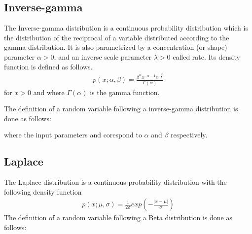 \documentclass[letterpaper,10pt,english]{sphinxmanual}
\begin{document}
\subsection{Inverse-gamma}
\label{\detokenize{notes/guidemodels:inverse-gamma}}
The Inverse-gamma distribution is a continuous probability distribution which is the distribution of the reciprocal
of a variable distributed according to the gamma distribution. It is also parametrized by a concentration (or shape)
parameter \(\alpha>0\), and an inverse scale parameter \(\lambda>0\) called rate. Its density function is
defined as follows.
\begin{equation*}
\begin{split}p(x;\alpha, \beta) = \frac{\beta^\alpha x^{-\alpha - 1} e^{-\frac{\beta}{x}}}{\Gamma(\alpha)}\end{split}
\end{equation*}
for \(x > 0\) and where \(\Gamma(\alpha)\) is the gamma function.

The definition of a random variable following a inverse-gamma distribution is done as follows:

\begin{sphinxVerbatim}[commandchars=\\\{\}]
   
\end{sphinxVerbatim}

where the input parameters  and  corespond to  \(\alpha\) and \(\beta\) respectively.


\subsection{Laplace}
\label{\detokenize{notes/guidemodels:laplace}}
The Laplace distribution is a continuous probability distribution with the following density function
\begin{equation*}
\begin{split}p(x;\mu,\sigma) = \frac{1}{2\sigma} exp \left( - \frac{|x - \mu |}{\sigma}\right)\end{split}
\end{equation*}
The definition of a random variable following a Beta distribution is done as follows:

\begin{sphinxVerbatim}[commandchars=\\\{\}]
   


  
\end{sphinxVerbatim}
\end{document}

